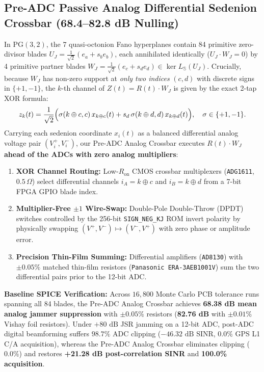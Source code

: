 \documentclass[12pt,letterpaper]{article}
\begin{document}
\subsection{Pre-ADC Passive Analog Differential Sedenion Crossbar (68.4--82.8 dB Nulling)}
In $\mathrm{PG}(3,2)$, the 7 quasi-octonion Fano hyperplanes contain 84 primitive zero-divisor blades $U_J = \frac{1}{\sqrt{2}}(e_a + s_b e_b)$, each annihilated identically ($U_J \cdot W_J = 0$) by 4 primitive partner blades $W_J = \frac{1}{\sqrt{2}}(e_c + s_d e_d) \in \ker L_{\mathbb{S}}(U_J)$. Crucially, because $W_J$ has non-zero support at \textit{only two indices} $(c, d)$ with discrete signs in $\{+1, -1\}$, the $k$-th channel of $Z(t) = R(t)\cdot W_J$ is given by the exact 2-tap XOR formula:
\[
    z_k(t) = \frac{1}{\sqrt{2}}\Bigl(\sigma(k\oplus c, c)\, x_{k\oplus c}(t) + s_d\, \sigma(k\oplus d, d)\, x_{k\oplus d}(t)\Bigr), \quad \sigma \in \{+1, -1\}.
\]
Carrying each sedenion coordinate $x_i(t)$ as a balanced differential analog voltage pair $(V_i^+, V_i^-)$, our Pre-ADC Analog Crossbar executes $R(t)\cdot W_J$ \textbf{ahead of the ADCs with zero analog multipliers}:
\begin{enumerate}[leftmargin=16pt,itemsep=1pt,topsep=1pt]
    \item \textbf{XOR Channel Routing:} Low-$R_{\mathrm{on}}$ CMOS crossbar multiplexers (\texttt{ADG1611}, $0.5\,\Omega$) select differential channels $i_A = k \oplus c$ and $i_B = k \oplus d$ from a 7-bit FPGA GPIO blade index.
    \item \textbf{Multiplier-Free $\pm 1$ Wire-Swap:} Double-Pole Double-Throw (DPDT) switches controlled by the 256-bit \texttt{SIGN\_NEG\_KJ} ROM invert polarity by physically swapping $(V^+, V^-) \mapsto (V^-, V^+)$ with zero phase or amplitude error.
    \item \textbf{Precision Thin-Film Summing:} Differential amplifiers (\texttt{AD8130}) with $\pm 0.05\%$ matched thin-film resistors (\texttt{Panasonic ERA-3AEB1001V}) sum the two differential pairs prior to the 12-bit ADC.
\end{enumerate}
\textbf{Baseline SPICE Verification:} Across $16{,}800$ Monte Carlo PCB tolerance runs spanning all 84 blades, the Pre-ADC Analog Crossbar achieves \textbf{68.38 dB mean analog jammer suppression} with $\pm 0.05\%$ resistors (\textbf{82.76 dB} with $\pm 0.01\%$ Vishay foil resistors). Under $+80\text{ dB}$ JSR jamming on a 12-bit ADC, post-ADC digital beamforming suffers $98.7\%$ ADC clipping ($-46.32\text{ dB}$ SINR, $0.0\%$ GPS L1 C/A acquisition), whereas the Pre-ADC Analog Crossbar eliminates clipping ($0.0\%$) and restores \textbf{+21.28 dB post-correlation SINR} and \textbf{100.0\% acquisition}.
\end{document}
